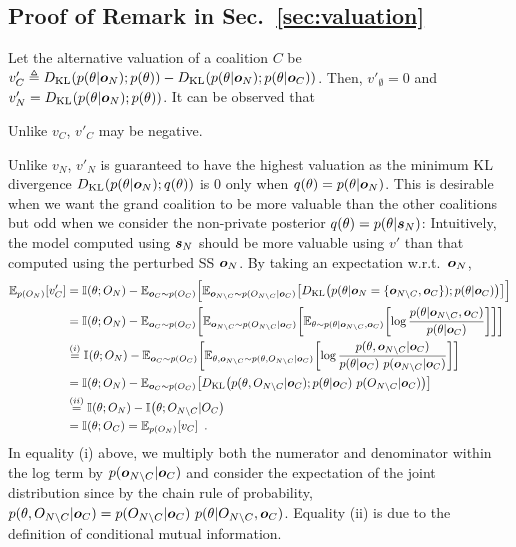 \documentclass{article}
\theoremstyle{plain}
\theoremstyle{definition}
\theoremstyle{remark}
\begin{document}
\subsection{Proof of Remark in Sec.~\ref{sec:valuation}}\label{app:valproofalt}
Let the alternative valuation of a coalition $C$ be
$v'_C \triangleq D_{\mathrm{KL}}\hspace{-0.5mm}\left({p(\theta|{\bm{o}}_N)};{p(\theta)}\right) -  D_{\mathrm{KL}}\hspace{-0.5mm}\left({p(\theta|{\bm{o}}_N)};{p(\theta|{\bm{o}}_C)}\right)$.
Then, $v'_\emptyset = 0$ and $v'_N = D_{\mathrm{KL}}\hspace{-0.5mm}\left({p(\theta|{\bm{o}}_N)};{p(\theta)}\right)$.
It can be observed that
\squishlisttwo
    \item Unlike $v_C$, $v'_C$ may be negative.
    \item Unlike $v_N$, $v'_N$ is guaranteed to have the highest valuation as the minimum KL divergence $D_{\mathrm{KL}}\hspace{-0.5mm}\left({p(\theta|{\bm{o}}_N)};{q(\theta)}\right)$ is $0$ only when $q(\theta) = p(\theta|{\bm{o}}_N)$. This is desirable when we want the grand coalition to be more valuable than the other coalitions but odd when we consider the non-private posterior $q(\theta) = p(\theta|{\bm{s}}_N)$: Intuitively, the model computed using ${\bm{s}}_N$ should be more valuable using $v'$ than that computed using the perturbed SS ${\bm{o}}_N$.
\squishend
By taking an expectation w.r.t.~${\bm{o}}_N$, 
\begin{align*} 
\Eu{p(O_N)}{v'_C} &= \MI{\theta; O_N} - \Eu {\vo_C \sim p(O_C)} {\Eu
{\vo_{N \setminus C} \sim p(O_{N \setminus C}|\vo_C)}
{\KL{{p(\theta|\vo_N = \{\vo_{N \setminus C}, \vo_C\})};{p(\theta|\vo_C)}}}} \\
&= \MI{\theta; O_N} - \Eu {\vo_C \sim p(O_C)} {
\Eu
{\vo_{N \setminus C} \sim p(O_{N \setminus C}|\vo_C)}
{\Eu{\theta \sim p(\theta| \vo_{N\setminus C}, \vo_C)} { \log \frac{p(\theta|\vo_{N \setminus C}, \vo_C)}{p(\theta|\vo_C)} }}} \\
&\overset{(i)}{=} \MI{\theta; O_N} - \Eu {\vo_C \sim p(O_C)} {
\Eu
{\theta, \vo_{N \setminus C} \sim p(\theta, O_{N \setminus C}|\vo_C)} { \log \frac{p(\theta, \vo_{N \setminus C} | \vo_C)}{p(\theta|\vo_C)\ p(\vo_{N \setminus C}|\vo_C)} }} \\
&= \MI{\theta; O_N} - \Eu {\vo_C \sim p(O_C)} {\KL{{p(\theta, O_{N \setminus C} |\vo_C)};{p(\theta|\vo_C)\ p(O_{N \setminus C}|\vo_C)}}} \\
& \overset{(ii)}{=} \MI{\theta; O_N} - \MI{\theta;  O_{N \setminus C} |O_C} \\
& = \MI{\theta; O_C} = \Eu{p(O_N)}{v_C}\ .
\end{align*}
In equality (i) above, we multiply both the numerator and denominator within the log term by $p({\bm{o}}_{N \setminus C}|{\bm{o}}_C)$ and consider the expectation of the joint distribution since by the chain rule of probability, $p(\theta, O_{N \setminus C}|{\bm{o}}_C) = p(O_{N \setminus C}|{\bm{o}}_C)\ p(\theta|O_{N \setminus C}, {\bm{o}}_C)$. Equality (ii) is due to the definition of conditional mutual information.
\end{document}
